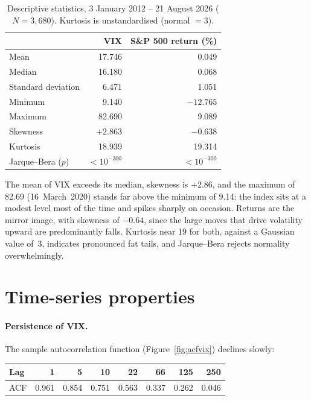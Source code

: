 \documentclass[10pt,a4paper]{article}
\begin{document}
\begin{table}[!htb]
\centering
\small
\caption{Descriptive statistics, 3 January 2012 -- 21 August 2026 ($N = 3{,}680$).
Kurtosis is unstandardised (normal $=3$).}
\begin{tabular}{lrr}
\toprule
 & \textbf{VIX} & \textbf{S\&P 500 return (\%)} \\
\midrule
Mean            & 17.746  & 0.049 \\
Median          & 16.180  & 0.068 \\
Standard deviation & 6.471 & 1.051 \\
Minimum         & 9.140   & $-12.765$ \\
Maximum         & 82.690  & 9.089 \\
Skewness        & $+2.863$ & $-0.638$ \\
Kurtosis        & 18.939  & 19.314 \\
Jarque--Bera ($p$) & $<10^{-300}$ & $<10^{-300}$ \\
\bottomrule
\end{tabular}
\end{table}

The mean of VIX exceeds its median, skewness is $+2.86$, and the maximum of 82.69
(16~March~2020) stands far above the minimum of 9.14: the index sits at a modest level
most of the time and spikes sharply on occasion. Returns are the mirror image, with
skewness of $-0.64$, since the large moves that drive volatility upward are predominantly
falls. Kurtosis near 19 for both, against a Gaussian value of~3, indicates pronounced fat
tails, and Jarque--Bera rejects normality overwhelmingly.

\section{Time-series properties}

\paragraph{Persistence of VIX.} The sample autocorrelation function (Figure~\ref{fig:acfvix})
declines slowly:

\begin{table}[H]
\centering\small
\begin{tabular}{lrrrrrrr}
\toprule
Lag & 1 & 5 & 10 & 22 & 66 & 125 & 250 \\
\midrule
ACF & 0.961 & 0.854 & 0.751 & 0.563 & 0.337 & 0.262 & 0.046 \\
\bottomrule
\end{tabular}
\end{table}
\end{document}
